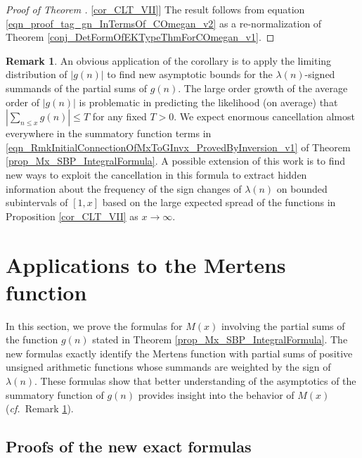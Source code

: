 \documentclass[11pt,reqno,a4letter]{article}
\newcommand{\hlocalref}[1]{\hyperref[#1]{\ref{#1}}}
\numberwithin{equation}{section}
\numberwithin{figure}{section}
\numberwithin{table}{section}
\newcommand{\cf}{\textit{cf.\ }}
\theoremstyle{plain}
\numberwithin{theorem}{section}
\theoremstyle{definition}
\newtheorem{remark}[theorem]{Remark}
\begin{document}
\begin{proof}[Proof of Theorem \hlocalref{cor_CLT_VII}]
The result follows from equation \eqref{eqn_proof_tag_gn_InTermsOf_COmegan_v2} 
as a re-normalization of Theorem \hlocalref{conj_DetFormOfEKTypeThmForCOmegan_v1}. 
\end{proof} 

\begin{remark}
\label{remark_ConjPropApps_SumsOfGx_v1}
An obvious application of the corollary is to apply the limiting 
distribution of $|g(n)|$ to find 
new asymptotic bounds for the $\lambda(n)$-signed summands of the 
partial sums of $g(n)$. 
The large order growth of the average order of $|g(n)|$ is problematic in 
predicting the likelihood (on average) that 
$\left\lvert \sum_{n \leq x} g(n) \right\rvert \leq T$ for any fixed $T > 0$. 
We expect enormous cancellation almost everywhere 
in the summatory function terms in 
\eqref{eqn_RmkInitialConnectionOfMxToGInvx_ProvedByInversion_v1} of 
Theorem \hlocalref{prop_Mx_SBP_IntegralFormula}. 
A possible extension of this work is to find new ways to 
exploit the cancellation in this formula to extract 
hidden information about the frequency of the sign changes of $\lambda(n)$ 
on bounded subintervals of $[1, x]$ based on the large expected spread of the functions in 
Proposition \hlocalref{cor_CLT_VII} as $x \rightarrow \infty$. 
\end{remark}

\section{Applications to the Mertens function} 
\label{Section_KeyApplications} 
\label{Section_KeyApplications_NewExactFormulasForMx_FullSectionLabel} 

In this section, we prove the formulas for $M(x)$ involving the partial sums 
of the function $g(n)$ stated in 
Theorem \hlocalref{prop_Mx_SBP_IntegralFormula}. 
The new formulas exactly identify the Mertens function with partial sums of 
positive unsigned arithmetic functions whose summands are 
weighted by the sign of $\lambda(n)$. 
These formulas show that better understanding of the 
asymptotics of the summatory function of $g(n)$ 
provides insight into the behavior of $M(x)$ 
(\cf Remark \hlocalref{remark_ConjPropApps_SumsOfGx_v1}). 

\subsection{Proofs of the new exact formulas} 
\label{subSection_KeyApplications_NewExactFormulasForMx} 
\end{document}
